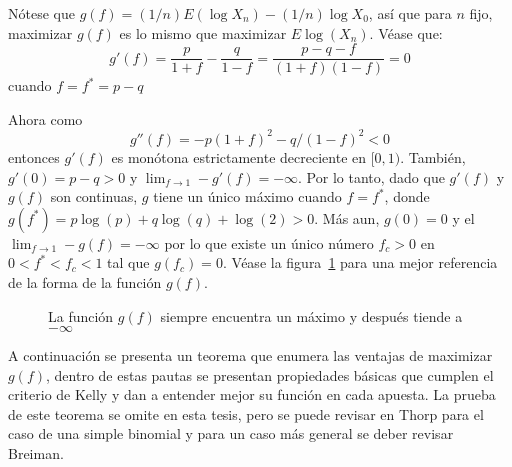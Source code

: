 Nótese que $g(f) = (1/n)E(\log{X_n})-(1/n)\log{X_0}$, así que para $n$ fijo, maximizar $g(f)$ es lo mismo que maximizar $E \log(X_n)$. Véase que:
\[g'(f) = \frac{p}{1+f} - \frac{q}{1-f} = \frac{p-q-f}{(1+f)(1-f)} = 0\]
cuando $f=f^* = p-q$

Ahora como
\[g''(f) = -p(1+f)^2 - q/(1-f)^2 < 0\]
 entonces $g'(f)$ es monótona estrictamente decreciente en $[0,1)$. También, $g'(0) =p -q >0$ y $\lim_{f\to1}-g'(f)=-\infty$. Por lo tanto, dado que $g'(f)$ y $g(f)$ son continuas, $g$ tiene un único máximo cuando $f=f^*$, donde $g(f^*) = p\log(p) + q\log(q) +\log(2) >0$. Más aun, $g(0)= 0$ y el $\lim_{f\to1}-g(f)=-\infty$ por lo que existe un único número $f_c>0$ en $0 < f^* < f_c < 1$ tal que $g(f_c)=0$. Véase la figura~\ref{Fig:Gf} para una mejor referencia de la forma de la función $g(f)$.
 
 \begin{figure}[!htb]\centering
    \begin {minipage}{0.65\textwidth}
      \caption{La función $g(f)$ siempre encuentra un máximo y después tiende a $-\infty$}\label{Fig:Gf}
    \end{minipage}
 \end{figure}
 
 A continuación se presenta un teorema que enumera las ventajas de maximizar $g(f)$, dentro de estas pautas se presentan propiedades básicas que cumplen el criterio de Kelly y dan a entender mejor su función en cada apuesta. La prueba de este teorema se omite en esta tesis, pero se puede revisar en Thorp\cite{thorp1969optimal} para el caso de una simple binomial y para un caso más general se deber revisar Breiman\cite{breiman1961optimal}.
 
